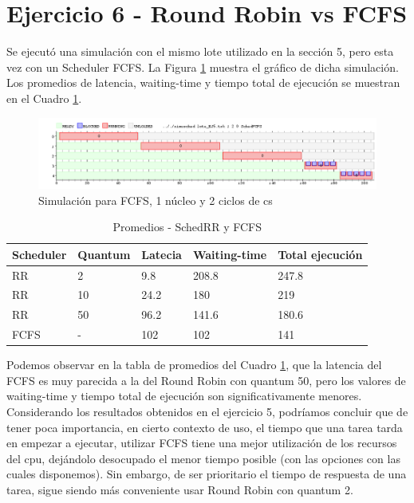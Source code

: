 \section{Ejercicio 6 - Round Robin vs FCFS}

Se ejecutó una simulación con el mismo lote utilizado en la sección 5, pero esta vez con un Scheduler FCFS.  La Figura \ref{fig-ej6} muestra el gráfico de dicha simulación. Los promedios de latencia, waiting-time y tiempo total de ejecución se muestran en el Cuadro \ref{tab-promedios}.

\begin{figure}[!htb]
\begin{center}
  \includegraphics[scale=0.45]{imagenes/ej6.png}
\end{center}
\caption{Simulación para FCFS, 1 núcleo y 2 ciclos de cs}\label{fig-ej6}
\end{figure}

\begin{table}[!htb]
\begin{center}
\begin{tabular}{| l | l | l | l | l |}
\hline
Scheduler & Quantum & Latecia & Waiting-time & Total ejecución\\
\hline
RR & 2 & 9.8 & 208.8 & 247.8\\
\hline
RR & 10 & 24.2 & 180 & 219\\
\hline
RR & 50 & 96.2 & 141.6 & 180.6\\
\hline
FCFS & - & 102 & 102 & 141\\
\hline
\end{tabular}
\end{center}
\caption{Promedios - SchedRR y FCFS}\label{tab-promedios}
\end{table}

Podemos observar en la tabla de promedios del Cuadro \ref{tab-promedios}, que la latencia del FCFS es muy parecida a la del Round Robin con quantum 50, pero los valores de waiting-time y tiempo total de ejecución son significativamente menores. Considerando los resultados obtenidos en el ejercicio 5, podríamos concluir que de tener poca importancia, en cierto contexto de uso, el tiempo que una tarea tarda en empezar a ejecutar, utilizar FCFS tiene una mejor utilización de los recursos del cpu, dejándolo desocupado el menor tiempo posible (con las opciones con las cuales disponemos). Sin embargo, de ser prioritario el tiempo de respuesta de una tarea, sigue siendo más conveniente usar Round Robin con quantum 2.